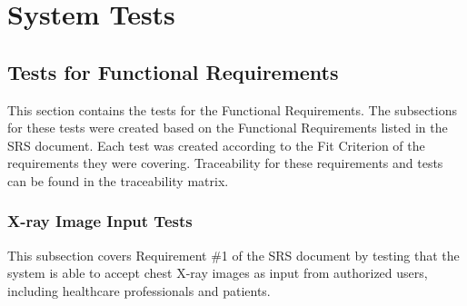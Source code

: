 \documentclass[12pt, titlepage]{article}
\begin{document}


\section{System Tests}

\subsection{Tests for Functional Requirements}

This section contains the tests for the Functional Requirements. The subsections for these tests were created based on the Functional Requirements listed in the SRS document. Each test was created according to the Fit Criterion of the requirements they were covering. Traceability for these requirements and tests can be found in the traceability matrix.

\subsubsection{X-ray Image Input Tests}

This subsection covers Requirement \#1 of the SRS document by testing that the system is able to accept chest X-ray images as input from authorized users, including healthcare professionals and patients.
\end{document}
